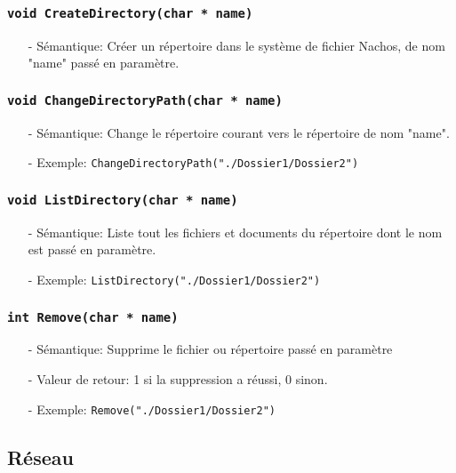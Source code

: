 \documentclass[11pt]{article}
\begin{document}
\subsubsection{\texttt{void CreateDirectory(char * name)}}
\begin{itemize}
\item[-]Sémantique: Créer un répertoire dans le système de fichier Nachos, de nom "name"
  passé en paramètre.
\end{itemize}

\subsubsection{\texttt{void ChangeDirectoryPath(char * name)}}
\begin{itemize}
\item[-]Sémantique: Change le répertoire courant vers le répertoire de nom "name".
\item[-]Exemple: \texttt{ChangeDirectoryPath("./Dossier1/Dossier2")}
\end{itemize}

\subsubsection{\texttt{void ListDirectory(char * name)}}
\begin{itemize}
\item[-]Sémantique: Liste tout les fichiers et documents du répertoire dont le nom est passé en paramètre.
\item[-]Exemple: \texttt{ListDirectory("./Dossier1/Dossier2")}
\end{itemize}

 \subsubsection{\texttt{int Remove(char * name)}}
\begin{itemize}
\item[-]Sémantique: Supprime le fichier ou répertoire passé en paramètre
\item[-]Valeur de retour: 1 si la suppression a réussi, 0 sinon.
\item[-]Exemple: \texttt{Remove("./Dossier1/Dossier2")}
\end{itemize}

\subsection{Réseau}
\end{document}
